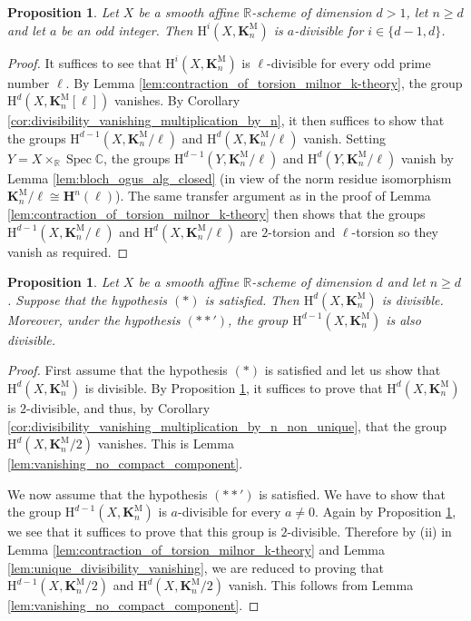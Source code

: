 \documentclass[11pt,leqno]{amsart}
\newcommand{\Spec}{\operatorname{Spec}}
\renewcommand{\1}{{\rm 1\hspace*{-0.4ex}%
\rule{0.1ex}{1.52ex}\hspace*{0.2ex}}}
\newcommand{\Hr}{{\mathrm {H}}}
\newcommand{\<}[1]{{\langle}#1 {\rangle}}
\newcommand{\Rb}{\mathbb{R}}
\newcommand{\Cb}{\mathbb{C}}
\newcommand{\Kbf}{\mathbf{K}}
\newcommand{\Mr}{\mathrm{M}}
\newcommand{\Hbf}{\mathbf{H}}
\theoremstyle{plain}
\newtheorem{prop}[thm]{Proposition}
\theoremstyle{definition}
\theoremstyle{remark}
\numberwithin{equation}{section}
\begin{document}
\begin{prop}\label{prop:kdivisibility_odd}
Let $X$ be a smooth affine $\Rb$-scheme of dimension $d>1$, let $n\geq d$ and let $a$ be an odd integer. Then $\Hr^{i}(X,\Kbf_n^\Mr)$ is $a$-divisible for $i\in\{d-1,d\}$.
\end{prop}

\begin{proof}
It suffices to see that $\Hr^i(X,\Kbf_n^\Mr)$ is $\ell$-divisible for every odd prime number $\ell$. By Lemma \ref{lem:contraction_of_torsion_milnor_k-theory}, the group $\Hr^d(X,\Kbf_n^\Mr[\ell])$ vanishes. By Corollary \ref{cor:divisibility_vanishing_multiplication_by_n}, it then suffices to show that the groups $\Hr^{d-1}(X,\Kbf_n^\Mr/\ell)$ and $\Hr^d(X,\Kbf_n^\Mr/\ell)$ vanish. Setting $Y=X\times_\Rb\Spec\Cb$, the groups $\Hr^{d-1}(Y,\Kbf_n^\Mr/\ell)$ and $\Hr^d(Y,\Kbf_n^\Mr/\ell)$ vanish by Lemma \ref{lem:bloch_ogus_alg_closed} (in view of the norm residue isomorphism $\Kbf_n^\Mr/\ell\cong\Hbf^n(\ell)$). The same transfer argument as in the proof of Lemma \ref{lem:contraction_of_torsion_milnor_k-theory} then shows that the groups $\Hr^{d-1}(X,\Kbf_n^\Mr/\ell)$ and $\Hr^d(X,\Kbf_n^\Mr/\ell)$ are $2$-torsion and $\ell$-torsion so they vanish as required. 
\end{proof}

\begin{prop}\label{prop:divisibility_Hd-1Kd_real}
Let $X$ be a smooth affine $\Rb$-scheme of dimension $d$ and let $n\geq d$. Suppose that the hypothesis $(*)$ is satisfied. Then $\Hr^d(X,\Kbf_n^\Mr)$ is divisible. Moreover, under the hypothesis $(**')$, the group $\Hr^{d-1}(X,\Kbf_n^\Mr)$ is also divisible.
\end{prop}

\begin{proof}
First assume that the hypothesis $(*)$ is satisfied and let us show that $\Hr^{d}(X,\Kbf_n^\Mr)$ is divisible. By Proposition \ref{prop:kdivisibility_odd}, it suffices to prove that $\Hr^d(X,\Kbf_n^\Mr)$ is $2$-divisible, and thus, by Corollary \ref{cor:divisibility_vanishing_multiplication_by_n_non_unique}, that the group $\Hr^d(X,\Kbf_n^\Mr/2)$ vanishes. This is Lemma \ref{lem:vanishing_no_compact_component}. 

We now assume that the hypothesis $(**')$ is satisfied. We have to show that the group $\Hr^{d-1}(X,\Kbf_n^\Mr)$ is $a$-divisible for every $a\neq 0$. Again by Proposition \ref{prop:kdivisibility_odd}, we see that it suffices to prove that this group is $2$-divisible. Therefore by (ii) in Lemma \ref{lem:contraction_of_torsion_milnor_k-theory} and Lemma \ref{lem:unique_divisibility_vanishing}, we are reduced to proving that $\Hr^{d-1}(X,\Kbf_n^\Mr/2)$ and $\Hr^{d}(X,\Kbf_n^\Mr/2)$ vanish. This follows from Lemma \ref{lem:vanishing_no_compact_component}.
\end{proof}
\end{document}
